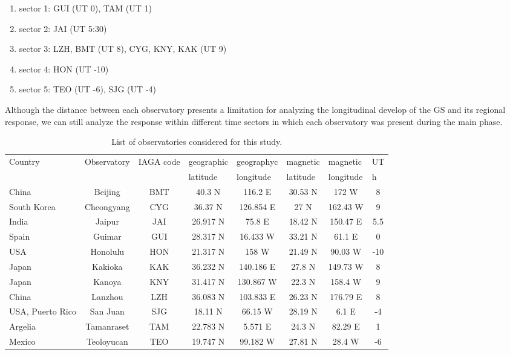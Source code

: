 \documentclass[a4paper]{article}
\theoremstyle{plain}
\theoremstyle{definition}
\begin{document}
	\begin{enumerate}
		\item sector 1: GUI (UT 0), TAM (UT 1) 
		\item sector 2: JAI (UT 5:30)
		\item sector 3: LZH, BMT (UT 8), CYG, KNY, KAK (UT 9)
		\item sector 4: HON (UT -10)
		\item sector 5: TEO (UT -6), SJG (UT -4) 
	\end{enumerate}
	
	Although the distance between each observatory presents a limitation for analyzing the longitudinal develop of the GS and its regional response, we can still analyze the response within different time sectors in which each observatory was present during the main phase. 
	
\begin{table}[htbp]
	\caption{List of observatories considered for this study.}
	\begin{tabular}{lccccccc}
		\hline
		Country & \multicolumn{1}{l}{Observatory} & \multicolumn{1}{l}{IAGA code} & \multicolumn{1}{l}{geographic } & \multicolumn{1}{l}{geographyc } & \multicolumn{1}{l}{magnetic} & \multicolumn{1}{l}{magnetic } & \multicolumn{1}{l}{UT} \\ 
		& \multicolumn{1}{l}{} & \multicolumn{1}{l}{} & \multicolumn{1}{l}{latitude} & \multicolumn{1}{l}{longitude} & \multicolumn{1}{l}{latitude} & \multicolumn{1}{l}{longitude} & \multicolumn{1}{l}{h} \\ \hline
		China & Beijing & BMT & 40.3 N & 116.2 E & 30.53 N & 172 W & 8 \\ 
		South Korea & Cheongyang & CYG & 36.37 N & 126.854 E & 27 N & 162.43 W & 9 \\ 
		India & Jaipur & JAI & 26.917 N & 75.8 E & 18.42 N & 150.47 E & 5.5 \\ 
		Spain & Guimar & GUI & 28.317 N & 16.433 W & 33.21 N & 61.1 E & 0 \\ 
		USA & Honolulu & HON & 21.317 N & 158 W & 21.49 N & 90.03 W & -10 \\ 
		Japan & Kakioka & KAK & 36.232 N & 140.186 E & 27.8 N & 149.73 W & 8 \\ 
		Japan & Kanoya & KNY & 31.417 N & 130.867 W & 22.3 N & 158.4 W & 9 \\ 
		China & Lanzhou & LZH & 36.083 N & 103.833 E & 26.23 N & 176.79 E & 8 \\ 
		USA, Puerto Rico & San Juan & SJG & 18.11 N & 66.15 W & 28.19 N & 6.1 E & -4 \\ 
		Argelia & Tamanraset & TAM & 22.783 N & 5.571 E & 24.3 N & 82.29 E & 1 \\
		Mexico & Teoloyucan & TEO & 19.747 N & 99.182 W & 27.81 N & 28.4 W & -6 \\  \hline
	\end{tabular}
	\label{tab:obs}
\end{table}
\end{document}
